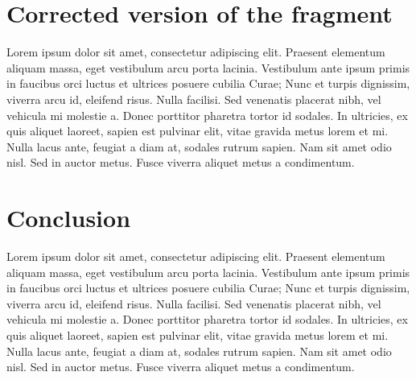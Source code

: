\documentclass[a4paper,12pt]{article}
\begin{document}
\newpage
\section{Corrected version of the fragment}
Lorem ipsum dolor sit amet, consectetur adipiscing elit. Praesent elementum aliquam massa, eget vestibulum arcu porta lacinia. Vestibulum ante ipsum primis in faucibus orci luctus et ultrices posuere cubilia Curae; Nunc et turpis dignissim, viverra arcu id, eleifend risus. Nulla facilisi. Sed venenatis placerat nibh, vel vehicula mi molestie a. Donec porttitor pharetra tortor id sodales. In ultricies, ex quis aliquet laoreet, sapien est pulvinar elit, vitae gravida metus lorem et mi. Nulla lacus ante, feugiat a diam at, sodales rutrum sapien. Nam sit amet odio nisl. Sed in auctor metus. Fusce viverra aliquet metus a condimentum.

\newpage
\section{Conclusion}
Lorem ipsum dolor sit amet, consectetur adipiscing elit. Praesent elementum aliquam massa, eget vestibulum arcu porta lacinia. Vestibulum ante ipsum primis in faucibus orci luctus et ultrices posuere cubilia Curae; Nunc et turpis dignissim, viverra arcu id, eleifend risus. Nulla facilisi. Sed venenatis placerat nibh, vel vehicula mi molestie a. Donec porttitor pharetra tortor id sodales. In ultricies, ex quis aliquet laoreet, sapien est pulvinar elit, vitae gravida metus lorem et mi. Nulla lacus ante, feugiat a diam at, sodales rutrum sapien. Nam sit amet odio nisl. Sed in auctor metus. Fusce viverra aliquet metus a condimentum.





\end{document}
